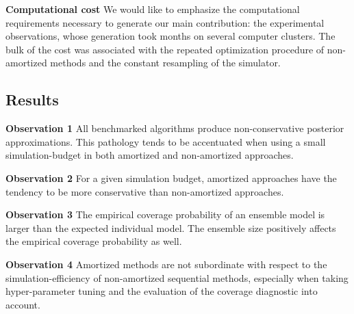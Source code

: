 \documentclass[twoside]{article}
\begin{document}
{\bfseries Computational cost} We would like to emphasize the computational requirements necessary to generate our main contribution: the experimental observations, whose generation took months on several computer clusters. The bulk of the cost was associated with the repeated optimization procedure of non-amortized methods and the constant resampling of the simulator.

\subsection{Results}
\protect\begin{custombox}
{\bfseries Observation 1} All benchmarked algorithms produce non-conservative posterior approximations. This pathology tends to be accentuated when using a small simulation-budget in both amortized and non-amortized approaches.

\medskip

{\bfseries Observation 2} For a given simulation budget, amortized approaches have the tendency to be more conservative than non-amortized approaches.

\medskip

{\bfseries Observation 3} The empirical coverage probability of an ensemble model is larger than the expected individual model. The ensemble size positively affects the empirical coverage probability as well.

\medskip

{\bfseries Observation 4} Amortized methods are not subordinate with respect to the simulation-efficiency of non-amortized sequential methods, especially when taking hyper-parameter tuning and the evaluation of the coverage diagnostic into account.
\end{custombox}
\end{document}
